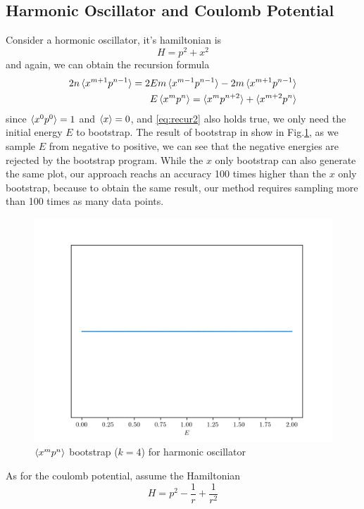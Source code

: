 \documentclass[aps,prl, preprint,amsmath, amssymb]{revtex4-2}
\begin{document}
\subsection{Harmonic Oscillator and Coulomb Potential}

Consider a hormonic oscillator, it's hamiltonian is
\begin{equation}
    H = p^2 + x^2
\end{equation}
and again, we can obtain the recursion formula
\begin{align}
    2n\braket{x^{m + 1} p^{n - 1}} = 2Em\braket{x^{m - 1} p^{n - 1}} - 2m\braket{x^{m + 1} p^{n - 1}}\notag \\ 
    E\braket{x^m p^n} = \braket{x^m p^{n + 2}} + \braket{x^{m + 2} p^n}
\end{align}
since $\braket{x^0 p^0} = 1$ and $\braket{x} = 0$, and \eqref{eq:recur2} also holds true, we only need the initial energy $E$ to bootstrap. The result of bootstrap in show in Fig.\ref{fig:harmonics}, as we sample $E$ from negative to positive, we can see that the negative energies are rejected by the bootstrap program. While the $x$ only bootstrap can also generate the same plot, our approach reachs an accuracy 100 times higher than the $x$ only bootstrap, because to obtain the same result, our method requires sampling more than 100 times as many data points.
\begin{figure}
    \includegraphics[width=0.8\linewidth]{harmonics.png}
    \caption{$\braket{x^m p^n}$ bootstrap ($k = 4$) for harmonic oscillator}
    \label{fig:harmonics}
\end{figure}
As for the coulomb potential, assume the Hamiltonian
\begin{equation}
    H = p^2 - \frac1r + \frac1{r^2}
\end{equation}
\end{document}
